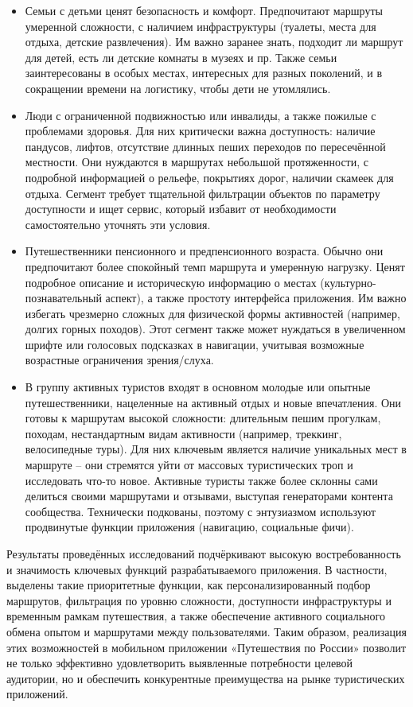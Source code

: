 \begin{itemize}
    \item 	Семьи с детьми ценят безопасность и комфорт. Предпочитают маршруты умеренной сложности, с наличием инфраструктуры (туалеты, места для отдыха, детские развлечения). Им важно заранее знать, подходит ли маршрут для детей, есть ли детские комнаты в музеях и пр. Также семьи заинтересованы в особых местах, интересных для разных поколений, и в сокращении времени на логистику, чтобы дети не утомлялись.
    \item 	Люди с ограниченной подвижностью или инвалиды, а также пожилые с проблемами здоровья. Для них критически важна доступность: наличие пандусов, лифтов, отсутствие длинных пеших переходов по пересечённой местности. Они нуждаются в маршрутах небольшой протяженности, с подробной информацией о рельефе, покрытиях дорог, наличии скамеек для отдыха. Сегмент требует тщательной фильтрации объектов по параметру доступности и ищет сервис, который избавит от необходимости самостоятельно уточнять эти условия.
    \item 	Путешественники пенсионного и предпенсионного возраста. Обычно они предпочитают более спокойный темп маршрута и умеренную нагрузку. Ценят подробное описание и историческую информацию о местах (культурно-познавательный аспект), а также простоту интерфейса приложения. Им важно избегать чрезмерно сложных для физической формы активностей (например, долгих горных походов). Этот сегмент также может нуждаться в увеличенном шрифте или голосовых подсказках в навигации, учитывая возможные возрастные ограничения зрения/слуха.
    \item 	В группу активных туристов входят в основном молодые или опытные путешественники, нацеленные на активный отдых и новые впечатления. Они готовы к маршрутам высокой сложности: длительным пешим прогулкам, походам, нестандартным видам активности (например, треккинг, велосипедные туры). Для них ключевым является наличие уникальных мест в маршруте – они стремятся уйти от массовых туристических троп и исследовать что-то новое. Активные туристы также более склонны сами делиться своими маршрутами и отзывами, выступая генераторами контента сообщества. Технически подкованы, поэтому с энтузиазмом используют продвинутые функции приложения (навигацию, социальные фичи).
\end{itemize}


Результаты проведённых исследований подчёркивают высокую востребованность и значимость ключевых функций разрабатываемого приложения. В частности, выделены такие приоритетные функции, как персонализированный подбор маршрутов, фильтрация по уровню сложности, доступности инфраструктуры и временным рамкам путешествия, а также обеспечение активного социального обмена опытом и маршрутами между пользователями. Таким образом, реализация этих возможностей в мобильном приложении «Путешествия по России» позволит не только эффективно удовлетворить выявленные потребности целевой аудитории, но и обеспечить конкурентные преимущества на рынке туристических приложений.

